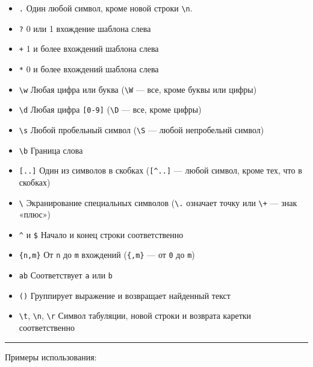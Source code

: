 \documentclass[11pt]{article}
\begin{document}
\begin{itemize}
\itemsep1pt\parskip0pt
\item
  \texttt{.} Один любой символ, кроме новой строки
  \texttt{\textbackslash{}n}.
\item
  \texttt{?} 0 или 1 вхождение шаблона слева
\item
  \texttt{+} 1 и более вхождений шаблона слева
\item
  \texttt{*} 0 и более вхождений шаблона слева
\item
  \texttt{\textbackslash{}w} Любая цифра или буква
  (\texttt{\textbackslash{}W} --- все, кроме буквы или цифры)
\item
  \texttt{\textbackslash{}d} Любая цифра \texttt{{[}0-9{]}}
  (\texttt{\textbackslash{}D} --- все, кроме цифры)
\item
  \texttt{\textbackslash{}s} Любой пробельный символ
  (\texttt{\textbackslash{}S} --- любой непробельнй символ)
\item
  \texttt{\textbackslash{}b} Граница слова
\item
  \texttt{{[}..{]}} Один из символов в скобках (\texttt{{[}\^{}..{]}}
  --- любой символ, кроме тех, что в скобках)
\item
  \texttt{\textbackslash{}} Экранирование специальных символов
  (\texttt{\textbackslash{}.} означает точку или
  \texttt{\textbackslash{}+} --- знак «плюс»)
\item
  \texttt{\^{}} и \texttt{\$} Начало и конец строки соответственно
\item
  \texttt{\{n,m\}} От \texttt{n} до \texttt{m} вхождений
  (\texttt{\{,m\}} --- от \texttt{0} до \texttt{m})
\item
  \texttt{a\textbar{}b} Соответствует \texttt{a} или \texttt{b}
\item
  \texttt{()} Группирует выражение и возвращает найденный текст
\item
  \texttt{\textbackslash{}t}, \texttt{\textbackslash{}n},
  \texttt{\textbackslash{}r} Символ табуляции, новой строки и возврата
  каретки соответственно
\end{itemize}

\begin{center}\rule{3in}{0.4pt}\end{center}

Примеры использования:
\end{document}

